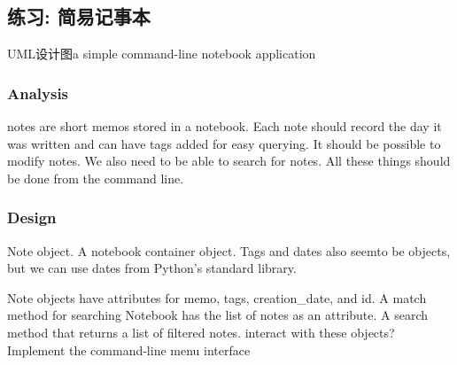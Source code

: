 \begin{python}

\section{练习: 简易记事本}
UML设计图a simple command-line notebook application
\subsubsection{Analysis}
notes are short memos stored in a notebook.  Each note should record
the day it was written and can have tags added for easy querying.  It
should be possible to modify notes.  We also need to be able to search
for notes.  All these things should be done from the command line.
\subsubsection{Design}

Note object.  A notebook container object.  Tags and dates also seemto
be objects, but we can use dates from Python's standard library.

Note objects have attributes for memo, tags, creation\_date, and id.  A
match method for searching Notebook has the list of notes as an
attribute.  A search method that returns a list of filtered notes.
interact with these objects? Implement the command-line menu interface







\end{python}
